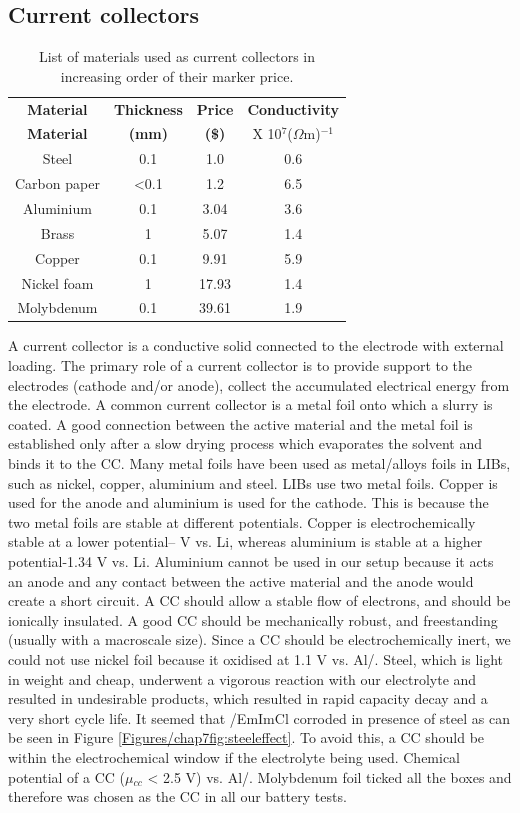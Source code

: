 \subsection*{Current collectors}
\begin{table}
\caption{List of materials used as current collectors in increasing order of their marker price.} \label{t2}
\begin{center}
 \begin{tabular}{|cccc|} 
 \hline
 \textbf{Material} & \textbf{Thickness} & \textbf{Price} & \textbf{Conductivity} \\
 \textbf{Material} & \textbf{(mm)} & \textbf{(\$)} & {X 10$^{7}$}({$\Omega$}m)$^{-1}$ \\
  \hline
 \hline
Steel & 0.1 & 1.0 & 0.6 \\ 
Carbon paper & <0.1 & 1.2 & 6.5 \\
Aluminium & 0.1 & 3.04 & 3.6 \\
Brass & 1 & 5.07 & 1.4 \\
Copper & 0.1 & 9.91 & 5.9 \\ 
Nickel foam & 1 & 17.93 & 1.4 \\
Molybdenum & 0.1 & 39.61 & 1.9 \\
\hline
\end{tabular}
\end{center}
\end{table}
A current collector is a conductive solid connected to the electrode with external loading. The primary role of a current collector is to provide support to the electrodes (cathode and/or anode), collect the accumulated electrical energy from the electrode. A common current collector is a metal foil onto which a slurry is coated. A good connection between the active material and the metal foil is established only after a slow drying process which evaporates the solvent and binds it to the CC. Many metal foils have been used as metal/alloys foils in LIBs, such as nickel, copper, aluminium and steel. LIBs use two metal foils. Copper is used for the anode and aluminium is used for the cathode. This is because the two metal foils are stable at different potentials. Copper is electrochemically stable at a lower potential--
 V vs. Li, whereas aluminium is stable at a higher potential-1.34 V vs. Li. Aluminium cannot be used in our setup because it acts an anode and any contact between the active material and the anode would create a short circuit.  A CC should allow a stable flow of electrons, and should be ionically insulated. A good CC should be mechanically robust, and freestanding (usually with a macroscale size). Since a CC should be electrochemically inert, we could not use nickel foil because it oxidised at 1.1 V vs. Al/. Steel, which is light in weight and cheap, underwent a vigorous reaction with our electrolyte and resulted in undesirable products, which resulted in rapid capacity decay and a very short cycle life. It seemed that /EmImCl corroded in presence of steel as can be seen in Figure \ref{Figures/chap7fig:steeleffect}. To avoid this, a CC should be within the electrochemical window if the electrolyte being used. Chemical potential of a CC ({$\mu${${_{cc}}$}} < 2.5 V) vs. Al/. Molybdenum foil ticked all the boxes and therefore was chosen as the CC in all our battery tests.  
